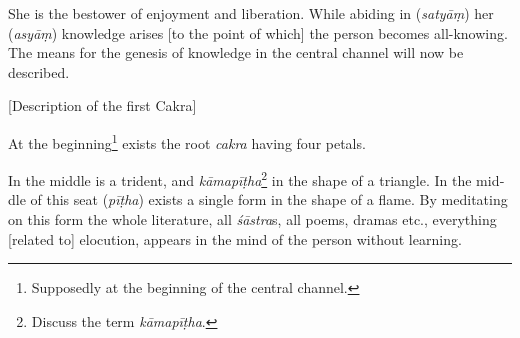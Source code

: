 \begin{otherlanguage}{english}
\begin{tlate}
      \end{tlate}
    \begin{tlate}
      She  is the bestower of enjoyment and liberation. While abiding in (\textit{satyāṃ}) her (\textit{asyāṃ}) knowledge arises [to the point of which] the person becomes all-knowing. The means for the genesis of knowledge in the central channel will now be described.
    \end{tlate}
      \bigskip
    \centerline{\textrm{\small{[Description of the first Cakra]}}}
    \bigskip
    \begin{tlate}
      At the beginning\footnote{Supposedly at the beginning of the central channel.} exists the root \textit{cakra} having four petals.
    \end{tlate}
    \begin{tlate}
    \end{tlate}
 \begin{tlate}
   In the middle is a trident, and \textit{kāmapīṭha}\footnote{Discuss the term \textit{kāmapīṭha}.} in the shape of a triangle. In the middle of this seat (\textit{pīṭha}) exists a single form in the shape of a flame. By meditating on this form the whole literature, all \textit{śāstra}s, all poems, dramas etc., everything [related to] elocution, appears in the mind of the person without learning.
 \end{tlate}
  \begin{tlate}

\end{tlate}
\end{otherlanguage}
